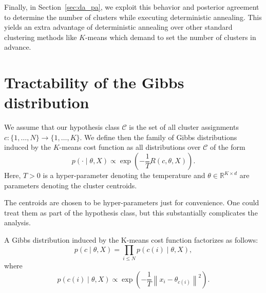 Finally, in Section~\ref{sec:da_pa}, we exploit this behavior and posterior agreement to determine the number of clusters while executing deterministic annealing. This yields an extra advantage of deterministic annealing over other standard clustering methods like $K$-means which demand to set the number of clusters in advance.

\section{Tractability of the Gibbs distribution}
\label{sec:gibbs_factorizes}

We assume that our hypothesis class $\mathcal{C}$ is the set of all cluster assignments $c : \{1, \ldots, N\} \to \{1, \ldots, K\}$. We define then the family of Gibbs distributions
induced by the $K$-means cost function as all distributions over $\mathcal{C}$ of the
form
%
\begin{equation}
p(\cdot \mid \theta, X) \propto \exp\left(-\frac{1}{T}R(c, \theta, X)\right).
\label{eq:gibbs_distr}
\end{equation}
%
Here, $T > 0$ is a hyper-parameter denoting the temperature and $\theta \in \mathbb{R}^{K \times d}$ are parameters denoting the cluster centroids. 

The centroids are chosen to be hyper-parameters just for convenience.
One could treat them as part of the hypothesis class, but this substantially complicates the analysis.

\begin{theorem}
A Gibbs distribution induced by the K-means cost function
factorizes as follows:
%
\begin{equation}
p(c \mid \theta, X) = \prod_{i \leq N} p(c(i) \mid \theta, X),
\label{eq:gibbs_distr_factorizes}
\end{equation}
%
where
%
\begin{equation}
p(c(i) \mid \theta, X) \propto \exp\left(-\frac{1}{T}\left\|x_i - \theta_{c(i)}\right\|^2\right).
\label{eq:gibbs_factors_da}
\end{equation}
%
\label{thm:gibbs_factorizes}
\end{theorem}


